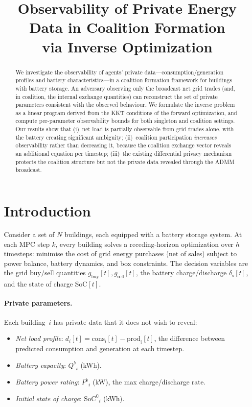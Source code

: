 \documentclass[11pt,a4paper]{article}
\title{Observability of Private Energy Data in Coalition Formation\\via Inverse Optimization}
\author{}
\date{}
\newcommand{\netload}{d}
\newcommand{\Qb}{{Q^b}}
\newcommand{\Pb}{{P^b}}
\newcommand{\SoC}{{\text{SoC}^0}}
\begin{document}
\maketitle

\begin{abstract}
We investigate the observability of agents' private data---consumption/generation profiles and battery characteristics---in a coalition formation framework for buildings with battery storage. An adversary observing only the broadcast net grid trades (and, in coalition, the internal exchange quantities) can reconstruct the set of private parameters consistent with the observed behaviour. We formulate the inverse problem as a linear program derived from the KKT conditions of the forward optimization, and compute per-parameter observability bounds for both singleton and coalition settings. Our results show that (i)~net load is partially observable from grid trades alone, with the battery creating significant ambiguity; (ii)~coalition participation \emph{increases} observability rather than decreasing it, because the coalition exchange vector reveals an additional equation per timestep; (iii)~the existing differential privacy mechanism protects the coalition structure but not the private data revealed through the ADMM broadcast.
\end{abstract}

\section{Introduction}\label{sec:intro}

Consider a set of $N$ buildings, each equipped with a battery storage system. At each MPC step $k$, every building solves a receding-horizon optimization over $h$ timesteps: minimise the cost of grid energy purchases (net of sales) subject to power balance, battery dynamics, and box constraints. The decision variables are the grid buy/sell quantities $g_{\text{buy}}[t], g_{\text{sell}}[t]$, the battery charge/discharge $\delta_s[t]$, and the state of charge $\text{SoC}[t]$.

\paragraph{Private parameters.}
Each building~$i$ has private data that it does not wish to reveal:
\begin{itemize}[nosep]
    \item \emph{Net load profile}: $\netload_i[t] = \text{cons}_i[t] - \text{prod}_i[t]$, the difference between predicted consumption and generation at each timestep.
    \item \emph{Battery capacity}: $\Qb_i$ (kWh).
    \item \emph{Battery power rating}: $\Pb_i$ (kW), the max charge/discharge rate.
    \item \emph{Initial state of charge}: $\SoC_i$ (kWh).
\end{itemize}
\end{document}
